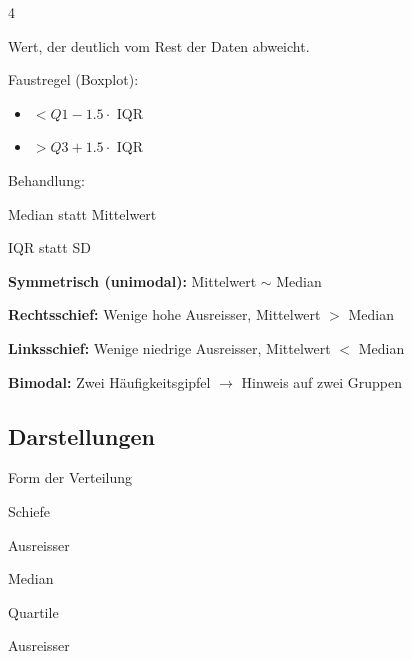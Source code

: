 \begin{landscape}
\begin{multicols*}{4}
\begin{cheatSheetBox}[title=Ausreisser]
Wert, der deutlich vom Rest der Daten abweicht.

Faustregel (Boxplot):
\begin{itemize}
\item $< Q1 - 1.5 \cdot$ \gls{IQR}
\item $> Q3 + 1.5 \cdot$ \gls{IQR}
\end{itemize}

Behandlung:
\begin{enumerate*}
\item Median statt Mittelwert
\item \gls{IQR} statt \gls{SD}
\end{enumerate*}
\end{cheatSheetBox}

\begin{cheatSheetBox}[title=Verteilungsformen]

\textbf{Symmetrisch (unimodal):}
Mittelwert $\sim$ Median

\textbf{Rechtsschief:}
Wenige hohe Ausreisser,
Mittelwert $>$ Median

\textbf{Linksschief:}
Wenige niedrige Ausreisser,
Mittelwert $<$ Median

\textbf{Bimodal:}
Zwei Häufigkeitsgipfel
$\rightarrow$ Hinweis auf zwei Gruppen
\end{cheatSheetBox}

\textcolor{\cheatSheetColor}{\subsection*{Darstellungen}}

\begin{cheatSheetBox}[title=Histogramm]
\begin{itemize*}
\item Form der Verteilung
\item Schiefe
\item Ausreisser
\end{itemize*}
\end{cheatSheetBox}

\begin{cheatSheetBox}[title=Boxplot]

\begin{itemize*}
\item Median
\item Quartile
\item Ausreisser
\end{itemize*}


\end{cheatSheetBox}
\end{multicols*}
\end{landscape}
